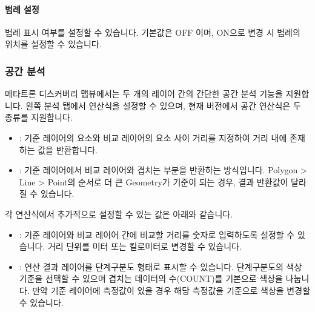 \documentclass[letterpaper,10pt,english]{sphinxmanual}
\begin{document}
\paragraph{범례 설정}
\label{\detokenize{discovery/part04/map_chart:id8}}
범례 표시 여부를 설정할 수 있습니다. 기본값은 OFF 이며, ON으로 변경 시 범례의 위치를 설정할 수 있습니다.
\begin{quote}

\begin{figure}[H]
\centering

\noindent{}
\end{figure}
\end{quote}


\subsubsection{공간 분석}
\label{\detokenize{discovery/part04/map_chart:id9}}
메타트론 디스커버리 맵뷰에서는 두 개의 레이어 간의 간단한 공간 분석 기능을 지원합니다. 왼쪽 분석 탭에서 연산식을 설정할 수 있으며, 현재 버전에서 공간 연산식은 두 종류를 지원합니다.
\begin{quote}

\begin{figure}[H]
\centering

\noindent{}
\end{figure}
\end{quote}
\begin{itemize}
\item {} 
: 기준 레이어의 요소와 비교 레이어의 요소 사이 거리를 지정하여 거리 내에 존재하는 값을 반환합니다.

\item {} 
: 기준 레이어에서 비교 레이어와 겹치는 부분을 반환하는 방식입니다. Polygon \textgreater{} Line \textgreater{} Point의 순서로 더 큰 Geometry가 기준이 되는 경우, 결과 반환값이 달라질 수 있습니다.

\end{itemize}

각 연산식에서 추가적으로 설정할 수 있는 값은 아래와 같습니다.
\begin{itemize}
\item {} 
: 기준 레이어와 비교 레이어 간에 비교할 거리를 숫자로 입력하도록 설정할 수 있습니다. 거리 단위를 미터 또는 킬로미터로 변경할 수 있습니다.

\item {} 
: 연산 결과 레이어를 단계구분도 형태로 표시할 수 있습니다. 단계구분도의 색상 기준을 선택할 수 있으며 겹치는 데이터의 수(COUNT)를 기본으로 색상을 나눕니다. 만약 기준 레이어에 측정값이 있을 경우 해당 측정값을 기준으로 색상을 변경할 수 있습니다.

\end{itemize}
\end{document}
